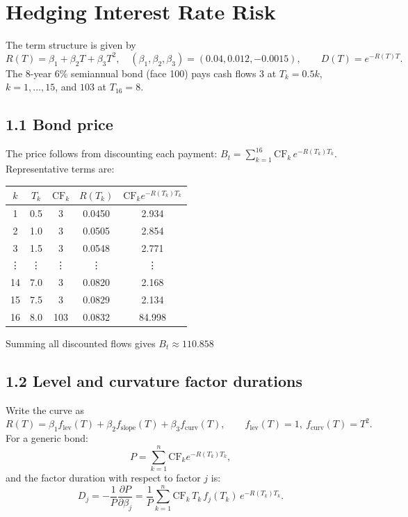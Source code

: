 \section{Hedging Interest Rate Risk}
The term structure is given by
\[
R(T)=\beta_1+\beta_2T+\beta_3T^2,\quad (\beta_1,\beta_2,\beta_3)=(0.04,0.012,-0.0015),\qquad
D(T)=e^{-R(T)T}.
\]
The 8-year 6\% semiannual bond (face 100) pays cash flows \(3\) at \(T_k=0.5k\), \(k=1,\dots,15\), and \(103\) at \(T_{16}=8\).

\subsection*{1.1 \quad Bond price}

The price follows from discounting each payment:
$
B_t=\sum_{k=1}^{16}\text{CF}_k\,e^{-R(T_k)T_k}.
$
Representative terms are:

\begin{center}
\begin{tabular}{c c c c c}
$k$ & $T_k$ & $\text{CF}_k$ & $R(T_k)$ & $\text{CF}_k e^{-R(T_k)T_k}$ \\ \hline
1 & 0.5 & 3   & 0.0450 & 2.934 \\
2 & 1.0 & 3   & 0.0505 & 2.854 \\
3 & 1.5 & 3   & 0.0548 & 2.771 \\
\vdots & \vdots & \vdots & \vdots & \vdots \\
14 & 7.0 & 3   & 0.0820 & 2.168 \\
15 & 7.5 & 3   & 0.0829 & 2.134 \\
16 & 8.0 & 103 & 0.0832 & 84.998 \\
\end{tabular}
\end{center}

Summing all discounted flows gives
$
\boxed{B_t \approx 110.858}
$

\subsection*{1.2 \quad Level and curvature factor durations}

Write the curve as
$
R(T)=\beta_1 f_{\text{lev}}(T)+\beta_2 f_{\text{slope}}(T)+\beta_3 f_{\text{curv}}(T),\qquad
f_{\text{lev}}(T)=1,\ f_{\text{curv}}(T)=T^2.
$
For a generic bond:
\[
P=\sum_{k=1}^n\text{CF}_k e^{-R(T_k)T_k},
\]
and the factor duration with respect to factor \(j\) is:
\[
D_j=-\frac{1}{P}\frac{\partial P}{\partial\beta_j}
   =\frac{1}{P}\sum_{k=1}^n\text{CF}_k\,T_k\,f_j(T_k)\,e^{-R(T_k)T_k}.
\]

